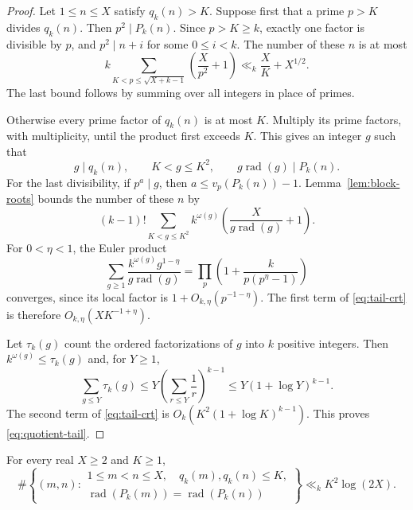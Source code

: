 \begin{proof}
Let $1\le n\le X$ satisfy $q_k(n)>K$. Suppose first that a prime $p>K$
divides $q_k(n)$. Then
$p^2\mid P_k(n)$. Since $p>K\ge k$, exactly one factor is divisible by
$p$, and $p^2\mid n+i$ for some $0\le i<k$. The number of these $n$ is
at most
\[
k\sum_{K<p\le\sqrt{X+k-1}}\left(\frac X{p^2}+1\right)
\ll_k\frac XK+X^{1/2}.
\]
The last bound follows by summing over all integers in place of primes.

Otherwise every prime factor of $q_k(n)$ is at most $K$. Multiply its
prime factors, with multiplicity, until the product first exceeds $K$.
This gives an integer $g$ such that
\[
g\mid q_k(n),\qquad K<g\le K^2,
\qquad g\operatorname{rad}(g)\mid P_k(n).
\]
For the last divisibility, if $p^a\mid g$, then
$a\le v_p(P_k(n))-1$. Lemma~\ref{lem:block-roots} bounds the number of
these $n$ by
\begin{equation}\label{eq:tail-crt}
(k-1)!\sum_{K<g\le K^2}k^{\omega(g)}
\left(\frac{X}{g\operatorname{rad}(g)}+1\right).
\end{equation}
For $0<\eta<1$, the Euler product
\[
\sum_{g\ge1}\frac{k^{\omega(g)}g^{1-\eta}}
                   {g\operatorname{rad}(g)}
=\prod_p\left(1+\frac{k}{p(p^\eta-1)}\right)
\]
converges, since its local factor is $1+O_{k,\eta}(p^{-1-\eta})$.
The first term of \eqref{eq:tail-crt} is therefore
$O_{k,\eta}(XK^{-1+\eta})$.

Let $\tau_k(g)$ count the ordered factorizations of $g$ into $k$
positive integers. Then $k^{\omega(g)}\le\tau_k(g)$ and, for $Y\ge1$,
\[
\sum_{g\le Y}\tau_k(g)
\le Y\left(\sum_{r\le Y}\frac1r\right)^{k-1}
\le Y(1+\log Y)^{k-1}.
\]
The second term of \eqref{eq:tail-crt} is
$O_k(K^2(1+\log K)^{k-1})$. This proves \eqref{eq:quotient-tail}.
\end{proof}

\begin{lemma}\label{lem:small-quotient}
For every real $X\ge2$ and $K\ge1$,
\[
\#\left\{(m,n):
\begin{gathered}
1\le m<n\le X,\quad q_k(m),q_k(n)\le K,\\
\operatorname{rad}(P_k(m))=\operatorname{rad}(P_k(n))
\end{gathered}\right\}
\ll_k K^2\log(2X).
\]
\end{lemma}

